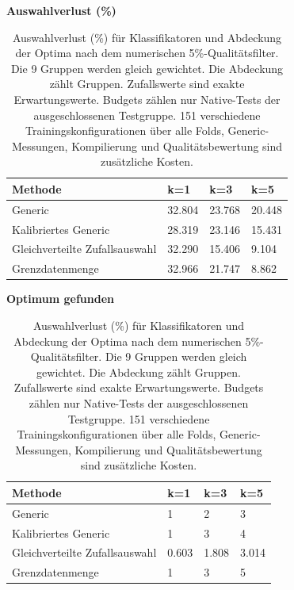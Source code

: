 \begin{table}[t]
\centering
\caption{Auswahlverlust (\%) für Klassifikatoren und Abdeckung der Optima nach dem numerischen 5\%-Qualitätsfilter. Die 9 Gruppen werden gleich gewichtet. Die Abdeckung zählt Gruppen. Zufallswerte sind exakte Erwartungswerte. Budgets zählen nur Native-Tests der ausgeschlossenen Testgruppe. 151 verschiedene Trainingskonfigurationen über alle Folds, Generic-Messungen, Kompilierung und Qualitätsbewertung sind zusätzliche Kosten.}
\label{tab:supp-calibration-summary}
\begingroup\small\setlength{\tabcolsep}{3pt}
\par\smallskip\textbf{Auswahlverlust (\%)}\par\smallskip
\begin{tabular}{llll}
\toprule
Methode & k=1 & k=3 & k=5 \\
\midrule
Generic & 32.804 & 23.768 & 20.448 \\
Kalibriertes Generic & 28.319 & 23.146 & 15.431 \\
Gleichverteilte Zufallsauswahl & 32.290 & 15.406 & 9.104 \\
Grenzdatenmenge & 32.966 & 21.747 & 8.862 \\
\bottomrule
\end{tabular}
\par\smallskip\textbf{Optimum gefunden}\par\smallskip
\begin{tabular}{llll}
\toprule
Methode & k=1 & k=3 & k=5 \\
\midrule
Generic & 1 & 2 & 3 \\
Kalibriertes Generic & 1 & 3 & 4 \\
Gleichverteilte Zufallsauswahl & 0.603 & 1.808 & 3.014 \\
Grenzdatenmenge & 1 & 3 & 5 \\
\bottomrule
\end{tabular}
\endgroup
\end{table}
